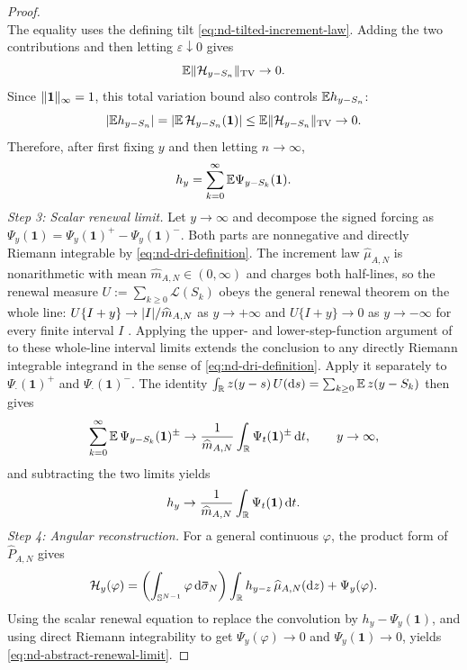 \documentclass[11pt,reqno,a4paper]{article}
\newcommand{\Ee}{\E}
\begin{document}
\begin{proof}
\begin{equation*}
  \end{equation*}
  The equality uses the defining tilt \cref{eq:nd-tilted-increment-law}.
  Adding the two contributions and then letting $\varepsilon\downarrow0$ gives
  \begin{equation*}
    \Ee\norm{\Hcal_{y-S_n}}_{\mathrm{TV}}\to0 .
  \end{equation*}
  Since $\lVert\mathbf 1\rVert_\infty=1$, this total variation bound also controls
  $\Ee h_{y-S_n}$:
  \begin{equation*}
    \abs{\Ee h_{y-S_n}}
    =
    \abs{\Ee\,\Hcal_{y-S_n}(\mathbf 1)}
    \leq
    \Ee\norm{\Hcal_{y-S_n}}_{\mathrm{TV}}
    \to0 .
  \end{equation*}
  Therefore, after first fixing $y$ and then letting $n\to\infty$,
  \begin{equation*}
    h_y
    =
    \sum_{k=0}^{\infty}
    \Ee\Psi_{y-S_k}(\mathbf 1).
  \end{equation*}
  \emph{Step 3: Scalar renewal limit.}
  Let $y\to\infty$ and decompose the signed forcing as
  $\Psi_y(\mathbf 1)=\Psi_y(\mathbf 1)^+-\Psi_y(\mathbf 1)^-$. Both parts are
  nonnegative and directly Riemann integrable by
  \cref{eq:nd-dri-definition}. The increment law $\widehat\mu_{A,N}$ is
  nonarithmetic with mean
  $\widehat m_{A,N}\in(0,\infty)$ and charges both half-lines, so the renewal
  measure $U:=\sum_{k\geq0}\mathcal L(S_k)$ obeys the general renewal theorem on
  the whole line: $U\{I+y\}\to\abs I/\widehat m_{A,N}$ as $y\to+\infty$ and
  $U\{I+y\}\to0$ as $y\to-\infty$ for every finite interval $I$
  \cite[Sec.~XI.9, (9.2)--(9.3)]{feller1971vol2}. Applying the
  upper- and lower-step-function argument of
  \cite[Sec.~XI.1, (1.10)--(1.17)]{feller1971vol2} to these
  whole-line interval limits extends the conclusion to any directly Riemann
  integrable integrand in the sense of \cref{eq:nd-dri-definition}. Apply it
  separately to
  $\Psi_\cdot(\mathbf 1)^+$ and $\Psi_\cdot(\mathbf 1)^-$. The identity
  $\int_\R z(y-s)\,U(\mathrm{d}s)=\sum_{k\geq0}\Ee\,z(y-S_k)$ then gives
  \begin{equation*}
    \sum_{k=0}^\infty\Ee\,\Psi_{y-S_k}(\mathbf 1)^\pm
    \to
    \frac{1}{\widehat m_{A,N}}\int_\R \Psi_t(\mathbf 1)^\pm\,\mathrm{d}t,
    \qquad y\to\infty,
  \end{equation*}
  and subtracting the two limits yields
  \begin{equation*}
    h_y
    \to
    \frac{1}{\widehat m_{A,N}}\int_{\mathbb{R}} \Psi_t(\mathbf 1)\,\mathrm{d}t .
  \end{equation*}
  \emph{Step 4: Angular reconstruction.}
  For a general continuous $\varphi$, the product form of
  $\widehat P_{A,N}$ gives
  \begin{equation*}
    \Hcal_y(\varphi)
    =
    \left(\int_{\mathbb S^{N-1}}\varphi\,\mathrm{d}\bar\sigma_N\right)
    \int_\R h_{y-z}\,\widehat\mu_{A,N}(\mathrm{d}z)
    +
    \Psi_y(\varphi).
  \end{equation*}
  Using the scalar renewal equation to replace the convolution by
  $h_y-\Psi_y(\mathbf 1)$, and using direct Riemann integrability to get
  $\Psi_y(\varphi)\to0$ and $\Psi_y(\mathbf 1)\to0$, yields
  \cref{eq:nd-abstract-renewal-limit}.
\end{proof}
\end{document}
